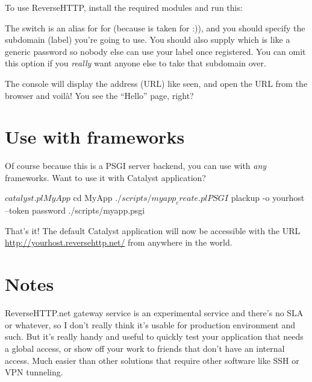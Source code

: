To use ReverseHTTP, install the required modules and run this:


The  switch is an alias for  for  (because
 is taken for  :)), and you should
specify the subdomain (label) you're going to use. You should also
supply  which is like a generic password so nobody
else can use your label once registered. You can omit this option if you
\emph{really} want anyone else to take that subdomain over.

The console will display the address (URL) like seen, and open the URL
from the browser and voil\`a! You see the ``Hello'' page, right?

\section{Use with frameworks}\label{use-with-frameworks}

Of course because this is a PSGI server backend, you can use with
\emph{any} frameworks. Want to use it with Catalyst application?

\begin{shell}
$ catalyst.pl MyApp
$ cd MyApp
$ ./scripts/myapp_create.pl PSGI
$ plackup -o yourhost --token password ./scripts/myapp.psgi
\end{shell}

That's it! The default Catalyst application will now be accessible with
the URL \url{http://yourhost.reversehttp.net/} from anywhere in the world.

\section{Notes}\label{notes}

ReverseHTTP.net gateway service is an experimental service and there's
no SLA or whatever, so I don't really think it's usable for production
environment and such. But it's really handy and useful to quickly test
your application that needs a global access, or show off your work to
friends that don't have an internal access. Much easier than other
solutions that require other software like SSH or VPN tunneling.

